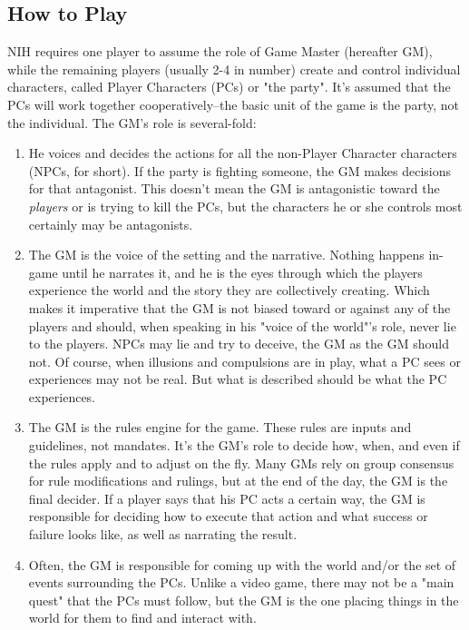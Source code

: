 \subsection{How to Play}
NIH requires one player to assume the role of Game Master (hereafter GM), while the remaining players (usually 2-4 in number) create and control individual characters, called Player Characters (PCs) or "the party". It's assumed that the PCs will work together cooperatively--the basic unit of the game is the party, not the individual. The GM's role is several-fold:
\begin{enumerate}
    \item He voices and decides the actions for all the non-Player Character characters (NPCs, for short). If the party is fighting someone, the GM makes decisions for that antagonist. This doesn't mean the GM is antagonistic toward the \textit{players} or is trying to kill the PCs, but the characters he or she controls most certainly may be antagonists.
    \item The GM is the voice of the setting and the narrative. Nothing happens in-game until he narrates it, and he is the eyes through which the players experience the world and the story they are collectively creating. Which makes it imperative that the GM is not biased toward or against any of the players and should, when speaking in his "voice of the world"'s role, never lie to the players. NPCs may lie and try to deceive, the GM as the GM should not. Of course, when illusions and compulsions are in play, what a PC sees or experiences may not be real. But what is described should be what the PC experiences.
    \item The GM is the rules engine for the game. These rules are inputs and guidelines, not mandates. It's the GM's role to decide how, when, and even if the rules apply and to adjust on the fly. Many GMs rely on group consensus for rule modifications and rulings, but at the end of the day, the GM is the final decider. If a player says that his PC acts a certain way, the GM is responsible for deciding how to execute that action and what success or failure looks like, as well as narrating the result. 
    \item Often, the GM is responsible for coming up with the world and/or the set of events surrounding the PCs. Unlike a video game, there may not be a "main quest" that the PCs must follow, but the GM is the one placing things in the world for them to find and interact with.
\end{enumerate}

